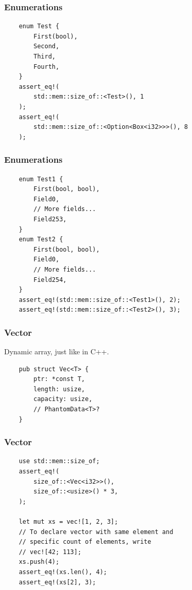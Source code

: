\documentclass[aspectratio=1610,t]{beamer}
\begin{document}

\begin{frame}[fragile]
\frametitle{Enumerations}

\begin{verbatim}
    enum Test {
        First(bool),
        Second,
        Third,
        Fourth,
    }
    assert_eq!(
        std::mem::size_of::<Test>(), 1
    );
    assert_eq!(
        std::mem::size_of::<Option<Box<i32>>>(), 8
    );
\end{verbatim}
\end{frame}


\begin{frame}[fragile]
\frametitle{Enumerations}
\begin{verbatim}
    enum Test1 {
        First(bool, bool),
        Field0,
        // More fields...
        Field253,
    }
    enum Test2 {
        First(bool, bool),
        Field0,
        // More fields...
        Field254,
    }
    assert_eq!(std::mem::size_of::<Test1>(), 2);
    assert_eq!(std::mem::size_of::<Test2>(), 3);
\end{verbatim}
\end{frame}


\begin{frame}[fragile]
\frametitle{Vector}
Dynamic array, just like in C++.

\begin{verbatim}
    pub struct Vec<T> {
        ptr: *const T,
        length: usize,
        capacity: usize,
        // PhantomData<T>?
    }
\end{verbatim}
\end{frame}


\begin{frame}[fragile]
\frametitle{Vector}
\begin{verbatim}
    use std::mem::size_of;
    assert_eq!(
        size_of::<Vec<i32>>(),
        size_of::<usize>() * 3,
    );

    let mut xs = vec![1, 2, 3];
    // To declare vector with same element and
    // specific count of elements, write
    // vec![42; 113];
    xs.push(4);
    assert_eq!(xs.len(), 4);
    assert_eq!(xs[2], 3);
\end{verbatim}
\end{frame}
\end{document}
